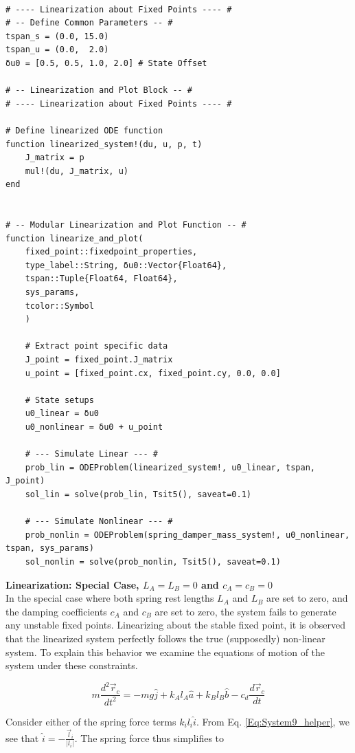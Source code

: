 \documentclass{article}
\begin{document}
\newpage
\begin{verbatim}

# ---- Linearization about Fixed Points ---- #
# -- Define Common Parameters -- #
tspan_s = (0.0, 15.0)
tspan_u = (0.0,  2.0)
δu0 = [0.5, 0.5, 1.0, 2.0] # State Offset

# -- Linearization and Plot Block -- #
# ---- Linearization about Fixed Points ---- #

# Define linearized ODE function
function linearized_system!(du, u, p, t)
    J_matrix = p
    mul!(du, J_matrix, u)
end


# -- Modular Linearization and Plot Function -- #
function linearize_and_plot(
    fixed_point::fixedpoint_properties,
    type_label::String, δu0::Vector{Float64},
    tspan::Tuple{Float64, Float64}, 
    sys_params,
    tcolor::Symbol
    )
    
    # Extract point specific data
    J_point = fixed_point.J_matrix
    u_point = [fixed_point.cx, fixed_point.cy, 0.0, 0.0]

    # State setups
    u0_linear = δu0
    u0_nonlinear = δu0 + u_point

    # --- Simulate Linear --- #
    prob_lin = ODEProblem(linearized_system!, u0_linear, tspan, J_point)
    sol_lin = solve(prob_lin, Tsit5(), saveat=0.1)

    # --- Simulate Nonlinear --- #
    prob_nonlin = ODEProblem(spring_damper_mass_system!, u0_nonlinear, tspan, sys_params)
    sol_nonlin = solve(prob_nonlin, Tsit5(), saveat=0.1) 
\end{verbatim}

\textbf{Linearization: Special Case, $L_A = L_B = 0$ and $c_A = c_B = 0$}\\
In the special case where both spring rest lengths $L_A$ and $L_B$ are set to zero, and the damping coefficients $c_A$ and $c_B$ are set to zero, the system fails to generate any unstable fixed points. Linearizing about the stable fixed point, it is observed that the linearized system perfectly follows the true (supposedly) non-linear system. To explain this behavior we examine the equations of motion of the system under these constraints.

\begin{equation}
    m \frac{d^2\vec{r}_c}{dt^2} = -mg\hat{j} + k_A l_A \hat{a} + k_B l_B\hat{b} - c_d \frac{d\vec{r}_c}{dt}     
\end{equation}

Consider either of the spring force terms $k_i l_i \hat{i}$. From Eq. \ref{Eq:System9_helper}, we see that $\hat{i} = -\frac{\vec{l}_i}{|l_i|}$. The spring force thus simplifies to
\end{document}
